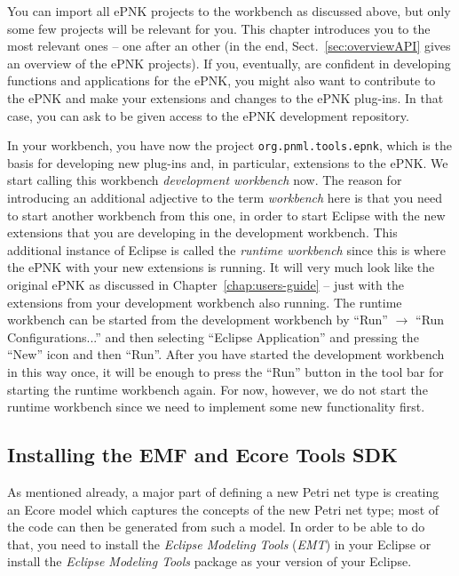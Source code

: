You can import all ePNK projects to the workbench as discussed above,
but only some few projects will be relevant for you. This chapter
introduces you to the most relevant ones -- one after an other
(in the end, Sect.~\ref{sec:overviewAPI} gives an overview of the ePNK
 projects).
If you, eventually, are confident in developing functions and applications
for the ePNK, you might also want to contribute to the ePNK and
make your extensions and changes to the ePNK plug-ins. In that case,
you can ask to be given access to the ePNK development repository.  

%
%
In your workbench, you have now the project {\tt org.pnml.tools.epnk}, 
which is the basis for developing new plug-ins and, in particular, extensions to
the ePNK. We start calling this workbench \emph{development workbench} now.
The reason for introducing an additional adjective to the term \emph{workbench}
here is that you need to start another workbench from this one, in order
to start Eclipse with the new extensions that you are developing in
the development workbench. This additional instance of Eclipse is called
the \emph{runtime workbench} since this is where the ePNK with your new
extensions is running. It will very much look like the original ePNK as discussed in
Chapter~\ref{chap:users-guide} -- just with the extensions from your
development workbench also running.  The
runtime workbench can be started from the development workbench by 
``Run'' $\rightarrow$ ``Run Configurations...'' and then selecting ``Eclipse
Application'' and pressing the ``New'' icon and then ``Run''. After you have
started the development workbench in this way once, it will be enough to press
the ``Run'' button in the tool bar for starting the runtime workbench again. 
For now, however, we do not start the runtime workbench since we need to
implement some new functionality first.%

\subsection{Installing the EMF and Ecore Tools SDK}
\label{subsec:installingEcoreTools}

As mentioned already, a major part of defining a new Petri net type is creating
an Ecore model which captures the concepts of the new Petri net type; most of
the code can then be generated from such a model. In order to be able to do
that, you need to install the \emph{Eclipse Modeling Tools} (\emph{EMT}) in
your Eclipse or install the \emph{Eclipse Modeling Tools} package as your version
of your Eclipse.

